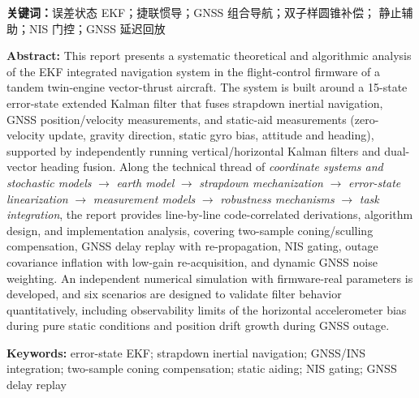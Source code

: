 \begin{titlepage}
\begin{minipage}{0.94\textwidth}
\vspace{0.6em}
\noindent\textbf{关键词：}误差状态 EKF；捷联惯导；GNSS 组合导航；双子样圆锥补偿；
静止辅助；NIS 门控；GNSS 延迟回放

\vspace{1.4em}
\textbf{Abstract:}
This report presents a systematic theoretical and algorithmic analysis of the
EKF integrated navigation system in the flight-control firmware of a tandem
twin-engine vector-thrust aircraft. The system is built around a 15-state
error-state extended Kalman filter that fuses strapdown inertial navigation,
GNSS position/velocity measurements, and static-aid measurements (zero-velocity
update, gravity direction, static gyro bias, attitude and heading), supported by
independently running vertical/horizontal Kalman filters and dual-vector heading
fusion. Along the technical thread of \emph{coordinate systems and stochastic
models} $\rightarrow$ \emph{earth model} $\rightarrow$ \emph{strapdown
mechanization} $\rightarrow$ \emph{error-state linearization} $\rightarrow$
\emph{measurement models} $\rightarrow$ \emph{robustness mechanisms}
$\rightarrow$ \emph{task integration}, the report provides line-by-line
code-correlated derivations, algorithm design, and implementation analysis,
covering two-sample coning/sculling compensation, GNSS delay replay with
re-propagation, NIS gating, outage covariance inflation with low-gain
re-acquisition, and dynamic GNSS noise weighting. An independent numerical
simulation with firmware-real parameters is developed, and six scenarios are
designed to validate filter behavior quantitatively, including observability
limits of the horizontal accelerometer bias during pure static conditions and
position drift growth during GNSS outage.

\vspace{0.6em}
\noindent\textbf{Keywords:} error-state EKF; strapdown inertial navigation;
GNSS/INS integration; two-sample coning compensation; static aiding; NIS
gating; GNSS delay replay
\end{minipage}
\end{titlepage}

\clearpage
{}
\tableofcontents
\thispagestyle{plain}

\clearpage
{}













\appendix




\clearpage



